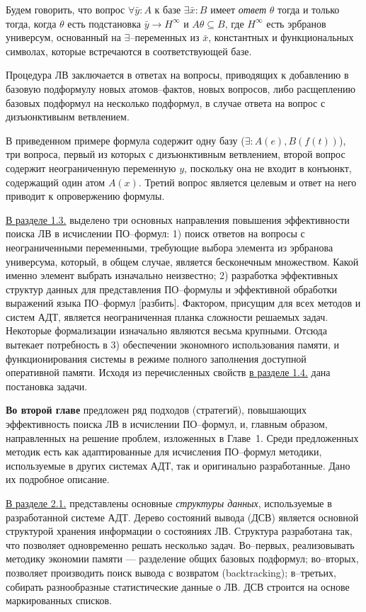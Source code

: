 \documentclass[a4paper]{report}
\begin{document}
Будем говорить, что вопрос $\forall \bar{y}\colon A$ к базе $\exists \bar{x}\colon B$ имеет {\em ответ} $\theta$  тогда и только тогда, когда $\theta$ есть подстановка $\bar{y} \rightarrow H^{\infty}$ и $A\theta \subseteq B$, где $H^{\infty}$ есть эрбранов универсум, основанный на $\exists$--переменных из $\bar{x}$, константных и функциональных символах, которые встречаются в соответствующей базе.

Процедура ЛВ заключается в ответах на вопросы, приводящих к добавлению в базовую подформулу новых атомов--фактов, новых вопросов, либо расщеплению базовых подформул на несколько подформул, в случае ответа на вопрос с дизъюнктивынм ветвлением.

В приведенном примере формула содержит одну базу ($\exists: A(e),B(f(t))$), три вопроса, первый из которых с дизъюнктивным ветвлением, второй вопрос содержит неограниченную переменную $y$, поскольку она не входит в конъюнкт, содержащий один атом $A(x)$. Третий вопрос является целевым и ответ на него приводит к опровержению формулы.

\underline{В разделе 1.3.} выделено три основных направления повышения эффективности поиска ЛВ в исчислении ПО--формул: 1) поиск ответов на вопросы с неограниченными переменными, требующие выбора элемента из эрбранова универсума, который, в общем случае, является бесконечным множеством. Какой именно элемент выбрать изначально неизвестно; 2) разработка эффективных структур данных для представления ПО--формулы и эффективной обработки выражений языка ПО--формул [разбить]. Фактором, присущим для всех методов и систем АДТ, является неограниченная планка сложности решаемых задач. Некоторые формализации изначально являются весьма крупными. Отсюда вытекает потребность в 3) обеспечении экономного использования памяти, и функционирования системы в режиме полного заполнения доступной оперативной памяти. Исходя из перечисленных свойств \underline{в разделе 1.4.} дана постановка задачи.



\textbf{Во второй главе} предложен ряд подходов (стратегий), повышающих эффективность поиска ЛВ в исчислении ПО--формул, и, главным образом, направленных на решение проблем, изложенных в Главе~1. Среди предложенных методик есть как адаптированные для исчисления ПО--формул методики, используемые в других системах АДТ, так и оригинально разработанные. Дано их подробное описание.

\underline{В разделе 2.1.} представлены основные \emph{структуры данных}, используемые в разработанной системе АДТ. Дерево состояний вывода (ДСВ) является основной структурой хранения информации о состояниях ЛВ. Структура разработана так, что позволяет одновременно решать несколько задач. Во--первых, реализовывать методику экономии памяти --- разделение общих базовых подформул; во--вторых, позволяет производить поиск вывода с возвратом (backtracking); в--третьих, собирать разнообразные статистические данные о ЛВ. ДСВ строится на основе маркированных списков.
\end{document}

